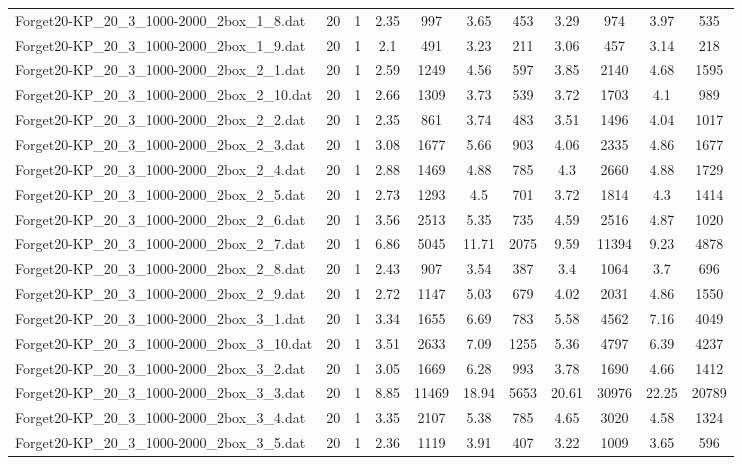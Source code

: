 \begin{table}[!ht]
\begin{tabular}{lcccccccccc}
Forget20-KP\_20\_3\_1000-2000\_2box\_1\_8.dat & 20 & 1 & 2.35 & 997 & 3.65 & 453 & 3.29 & 974 & 3.97 & 535 \\
Forget20-KP\_20\_3\_1000-2000\_2box\_1\_9.dat & 20 & 1 & 2.1 & 491 & 3.23 & 211 & 3.06 & 457 & 3.14 & 218 \\
Forget20-KP\_20\_3\_1000-2000\_2box\_2\_1.dat & 20 & 1 & 2.59 & 1249 & 4.56 & 597 & 3.85 & 2140 & 4.68 & 1595 \\
Forget20-KP\_20\_3\_1000-2000\_2box\_2\_10.dat & 20 & 1 & 2.66 & 1309 & 3.73 & 539 & 3.72 & 1703 & 4.1 & 989 \\
Forget20-KP\_20\_3\_1000-2000\_2box\_2\_2.dat & 20 & 1 & 2.35 & 861 & 3.74 & 483 & 3.51 & 1496 & 4.04 & 1017 \\
Forget20-KP\_20\_3\_1000-2000\_2box\_2\_3.dat & 20 & 1 & 3.08 & 1677 & 5.66 & 903 & 4.06 & 2335 & 4.86 & 1677 \\
Forget20-KP\_20\_3\_1000-2000\_2box\_2\_4.dat & 20 & 1 & 2.88 & 1469 & 4.88 & 785 & 4.3 & 2660 & 4.88 & 1729 \\
Forget20-KP\_20\_3\_1000-2000\_2box\_2\_5.dat & 20 & 1 & 2.73 & 1293 & 4.5 & 701 & 3.72 & 1814 & 4.3 & 1414 \\
Forget20-KP\_20\_3\_1000-2000\_2box\_2\_6.dat & 20 & 1 & 3.56 & 2513 & 5.35 & 735 & 4.59 & 2516 & 4.87 & 1020 \\
Forget20-KP\_20\_3\_1000-2000\_2box\_2\_7.dat & 20 & 1 & 6.86 & 5045 & 11.71 & 2075 & 9.59 & 11394 & 9.23 & 4878 \\
Forget20-KP\_20\_3\_1000-2000\_2box\_2\_8.dat & 20 & 1 & 2.43 & 907 & 3.54 & 387 & 3.4 & 1064 & 3.7 & 696 \\
Forget20-KP\_20\_3\_1000-2000\_2box\_2\_9.dat & 20 & 1 & 2.72 & 1147 & 5.03 & 679 & 4.02 & 2031 & 4.86 & 1550 \\
Forget20-KP\_20\_3\_1000-2000\_2box\_3\_1.dat & 20 & 1 & 3.34 & 1655 & 6.69 & 783 & 5.58 & 4562 & 7.16 & 4049 \\
Forget20-KP\_20\_3\_1000-2000\_2box\_3\_10.dat & 20 & 1 & 3.51 & 2633 & 7.09 & 1255 & 5.36 & 4797 & 6.39 & 4237 \\
Forget20-KP\_20\_3\_1000-2000\_2box\_3\_2.dat & 20 & 1 & 3.05 & 1669 & 6.28 & 993 & 3.78 & 1690 & 4.66 & 1412 \\
Forget20-KP\_20\_3\_1000-2000\_2box\_3\_3.dat & 20 & 1 & 8.85 & 11469 & 18.94 & 5653 & 20.61 & 30976 & 22.25 & 20789 \\
Forget20-KP\_20\_3\_1000-2000\_2box\_3\_4.dat & 20 & 1 & 3.35 & 2107 & 5.38 & 785 & 4.65 & 3020 & 4.58 & 1324 \\
Forget20-KP\_20\_3\_1000-2000\_2box\_3\_5.dat & 20 & 1 & 2.36 & 1119 & 3.91 & 407 & 3.22 & 1009 & 3.65 & 596 \\

\end{tabular}
\end{table}
